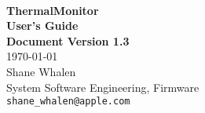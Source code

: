
\begin{titlepage}

\setlength{\parindent}{0in}

{
	\fontsize{32}{32}\selectfont
	\textcolor{AppleGray}{\AppleLogo}
}
\\[0.25in]

{
	\fontsize{32}{32}\selectfont
	\textcolor{SmokeyDarkBlue}{\bfseries ThermalMonitor} \\[0.3ex]
	\textbf{User's Guide} 
}
\\[0.25in]

\textbf{Document Version 1.3} \\
\today
\\[0.25in]

Shane Whalen \\
System Software Engineering, Firmware \\
\texttt{shane\_whalen@apple.com}

\vfill

\begin{center}
\end{center}

\end{titlepage}
